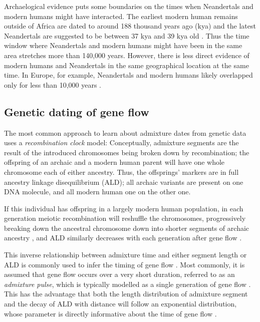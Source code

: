 \documentclass[]{article}
\begin{document}
 
Archaelogical evidence puts some boundaries on the times when Neandertals and modern humans might have interacted. The earliest modern human remains outside of Africa are dated to around 188 thousand years ago (kya)  \citep{hershkovitz_earliest_2018,stringer_when_2018} and the latest Neandertals are suggested to be between 37 kya and 39 kya old \citep{higham_timing_2014,zilhao_precise_2017}. Thus the time window where Neandertals and modern humans might have been in the same area stretches more than 140,000 years. However, there is less direct evidence of modern humans and Neandertals in the same geographical location at the same time. In Europe, for example, Neandertals and modern humans likely overlapped only for less than 10,000 years \citep{bard_extended_2020}. 

\subsection{Genetic dating of gene flow}\label{Admixture models}

The most common approach to learn about admixture dates from genetic data uses a \emph{recombination clock} model: Conceptually, admixture segments are the result of the introduced chromosomes being broken down by recombination; the offspring of an archaic and a modern human parent will have one whole chromosome each of either ancestry. Thus, the offsprings' markers are in full ancestry linkage disequilibrium (ALD); all archaic variants are present on one DNA molecule, and all modern human one on the other one.

If this individual has offspring in a largely modern human population, in each generation meiotic recombination will reshuffle the chromosomes, progressively breaking down the ancestral chromosome down into shorter segments of archaic ancestry \citep{falush_inference_2003, gravel_population_2012,liang_lengths_2014}, and ALD similarly decreases with each generation after gene flow \citep{chakraborty_admixture_1988,stephens_mapping_1994,wall_detecting_2000}.


This inverse relationship between admixture time and either segment length or ALD is commonly used to infer the timing of gene flow \citep{pool_inference_2009,moorjani_history_2011,pugach_dating_2011,gravel_population_2012,sankararaman_date_2012,loh_inferring_2013,hellenthal_genetic_2014,liang_lengths_2014,sankararaman_combined_2016,pugach_gateway_2018,jacobs_multiple_2019}. Most commonly, it is assumed that gene flow occurs over a very short duration, referred to as an \textit{admixture pulse}, which is typically modelled as a single generation of gene flow \citep[e.g][]{moorjani_history_2011}. This has the advantage that both the length distribution of admixture segment and the decay of ALD with distance will follow an exponential distribution, whose parameter is directly informative about the time of gene flow \citep{pool_inference_2009, liang_lengths_2014, gravel_population_2012}.
\end{document}
